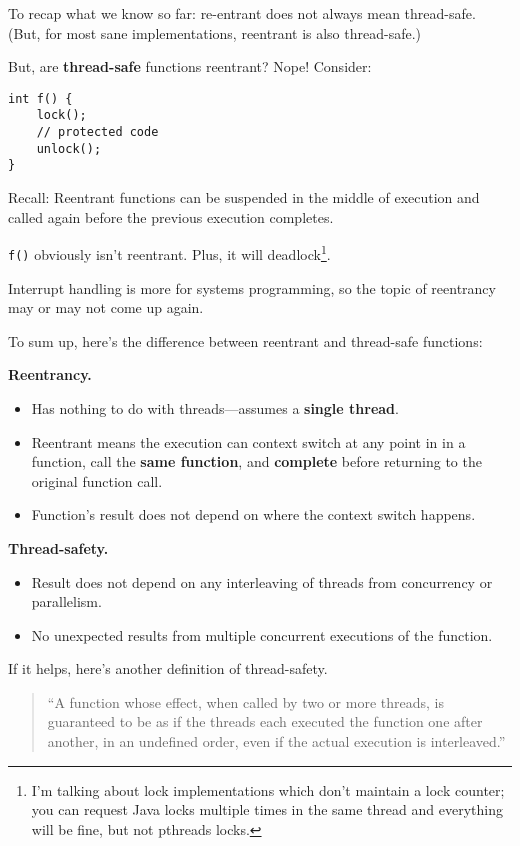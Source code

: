 To recap what we know so far: re-entrant does not always mean thread-safe. (But, for most sane implementations, reentrant is also thread-safe.)

But, are {\bf thread-safe} functions reentrant?
Nope! Consider:

  \begin{lstlisting}[basicstyle=\scriptsize]
int f() {
    lock();
    // protected code
    unlock();
}
  \end{lstlisting}

Recall:  Reentrant functions can be suspended in the middle of execution
    and called again before the previous execution completes.

{\tt f()} obviously isn't reentrant. Plus, it will deadlock\footnote{I'm talking about lock implementations which don't maintain a lock counter; you can request Java locks multiple times in the same thread and everything will be fine, but not pthreads locks.}.

Interrupt handling is more for systems programming, so the topic of reentrancy may or may not come
up again.

To sum up, here's the difference between reentrant and thread-safe functions:

  {\bf Reentrancy.}
  \begin{itemize}
    \item Has nothing to do with threads---assumes a {\bf single thread}.
    \item Reentrant means the execution can context switch at any point in
      in a function, call the {\bf same function}, and {\bf complete} before
      returning to the original function call.
    \item Function's result does not depend on where the context switch happens.
  \end{itemize}

  {\bf Thread-safety.}
  \begin{itemize}
    \item Result does not depend on any interleaving of threads from
      concurrency or parallelism.
    \item No unexpected results from multiple concurrent executions of the function.
  \end{itemize}

If it helps, here's another definition of thread-safety.
\begin{quote}
  ``A function whose effect, when called by two or more threads, is guaranteed to
  be as if the threads each executed the function one after another, in an
  undefined order, even if the actual execution is interleaved.''
\end{quote}

